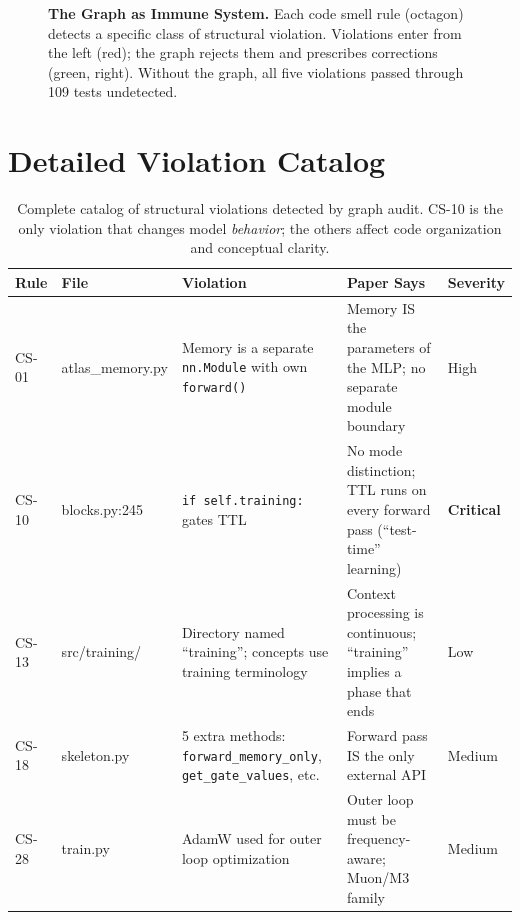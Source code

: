 \documentclass[11pt,letterpaper]{article}
\begin{document}
\begin{figure}[h!]
\caption{\textbf{The Graph as Immune System.} Each code smell rule (octagon)
detects a specific class of structural violation. Violations enter from the
left (red); the graph rejects them and prescribes corrections (green, right).
Without the graph, all five violations passed through 109 tests undetected.}
\label{fig:immune-system}
\end{figure}


\section{Detailed Violation Catalog}

\begin{table}[h!]
\centering
\small
\begin{tabular}{@{}llp{4.2cm}p{4.2cm}l@{}}
\toprule
\textbf{Rule} & \textbf{File} & \textbf{Violation} & \textbf{Paper Says} & \textbf{Severity} \\
\midrule
CS-01 & atlas\_memory.py &
  Memory is a separate \texttt{nn.Module} with own \texttt{forward()} &
  Memory IS the parameters of the MLP; no separate module boundary &
  High \\
\addlinespace
CS-10 & blocks.py:245 &
  \texttt{if self.training:} gates TTL &
  No mode distinction; TTL runs on every forward pass (``test-time'' learning) &
  \textbf{Critical} \\
\addlinespace
CS-13 & src/training/ &
  Directory named ``training''; concepts use training terminology &
  Context processing is continuous; ``training'' implies a phase that ends &
  Low \\
\addlinespace
CS-18 & skeleton.py &
  5 extra methods: \texttt{forward\_memory\_only}, \texttt{get\_gate\_values}, etc. &
  Forward pass IS the only external API &
  Medium \\
\addlinespace
CS-28 & train.py &
  AdamW used for outer loop optimization &
  Outer loop must be frequency-aware; Muon/M3 family &
  Medium \\
\bottomrule
\end{tabular}
\caption{Complete catalog of structural violations detected by graph audit.
CS-10 is the only violation that changes model \emph{behavior}; the others
affect code organization and conceptual clarity.}
\label{tab:violations}
\end{table}
\end{document}
